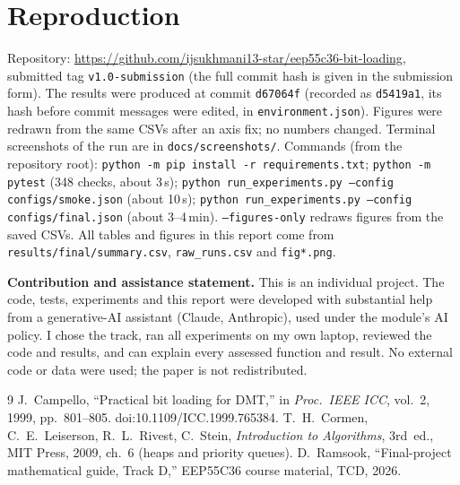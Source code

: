 \documentclass[10pt,a4paper]{article}
\newcommand{\repo}{https://github.com/ijsukhmani13-star/eep55c36-bit-loading}
\begin{document}
\section{Reproduction}
\sloppy
Repository: \url{\repo}, submitted tag \texttt{v1.0-submission} (the full commit hash is given in the submission form).
The results were produced at commit \texttt{d67064f} (recorded as \texttt{d5419a1}, its hash before commit messages were edited, in \texttt{environment.json}). Figures were redrawn from the same CSVs after an axis fix; no numbers changed. Terminal screenshots of the run
are in \texttt{docs/screenshots/}. Commands (from the repository root):
\texttt{python -m pip install -r requirements.txt}; \texttt{python -m pytest} (348 checks, about 3\,s);
\texttt{python run\_experiments.py --config configs/smoke.json} (about 10\,s);
\texttt{python run\_experiments.py --config configs/final.json} (about 3--4\,min). \texttt{--figures-only} redraws figures from the saved CSVs. All tables and figures in this report come from \texttt{results/final/summary.csv},
\texttt{raw\_runs.csv} and \texttt{fig*.png}.

\textbf{Contribution and assistance statement.} This is an individual project. The code, tests, experiments and this report were
developed with substantial help from a generative-AI assistant (Claude, Anthropic), used under the module's AI policy. I chose
the track, ran all experiments on my own laptop, reviewed the code and results, and can explain every assessed function and
result. No external code or data were used; the paper is not redistributed.

\begin{thebibliography}{9}\small
{} J.~Campello, ``Practical bit loading for DMT,'' in \emph{Proc.\ IEEE ICC}, vol.~2, 1999,
pp.~801--805. doi:10.1109/ICC.1999.765384.
 T.~H.~Cormen, C.~E.~Leiserson, R.~L.~Rivest, C.~Stein, \emph{Introduction to Algorithms},
3rd~ed., MIT Press, 2009, ch.~6 (heaps and priority queues).
 D.~Ramsook, ``Final-project mathematical guide, Track D,'' EEP55C36 course material, TCD, 2026.
\end{thebibliography}

\clearpage
\appendix
\end{document}
